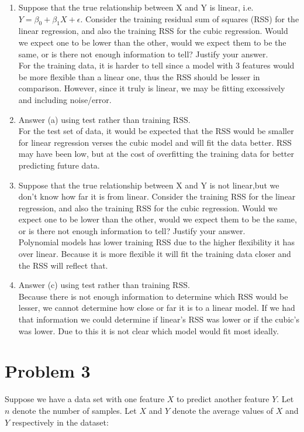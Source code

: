 \documentclass[12pt]{article}
\begin{document}
\begin{enumerate}
    \item Suppose that the true relationship between X and Y is linear, i.e. $Y = \beta_0 + \beta_1X + \epsilon$.  Consider the training residual sum of squares (RSS) for the linear regression, and also the training RSS for the cubic regression. Would we expect one to be lower than the other, would we expect them to be the same, or is there not enough information to tell? Justify your answer.\\ For the training data, it is harder to tell since a model with 3 features would be more flexible than a linear one, thus the RSS should be lesser in comparison. However, since it truly is linear, we may be fitting excessively and including noise/error.
    \item Answer (a) using test rather than training RSS.\\ For the test set of data, it would be expected that the RSS would be smaller for linear regression verses the cubic model and will fit the data better. RSS may have been low, but at the cost of overfitting the training data for better predicting future data.
    \item Suppose that the true relationship between X and Y is not linear,but we don't know how far it is from linear. Consider the training RSS for the linear regression, and also the training RSS for the cubic regression. Would we expect one to be lower than the other, would we expect them to be the same, or is there not enough information to tell? Justify your answer.\\ Polynomial models has lower training RSS due to the higher flexibility it has over linear. Because it is more flexible it will fit the training data closer and the RSS will reflect that.
    \item Answer (c) using test rather than training RSS.\\
          Because there is not enough information to determine which RSS would be lesser, we cannot determine how close or far it is to a linear model. If we had that information we could determine if linear's RSS was lower or if the cubic's was lower. Due to this it is not clear which model would fit most ideally.
\end{enumerate}

\pagebreak
\section*{Problem 3}
Suppose we have a data set with one feature $X$ to predict another feature $Y$. Let $n$ denote the number of samples. Let $X$ and $Y$ denote the average values of $X$ and $Y$ respectively in the dataset:
\end{document}

